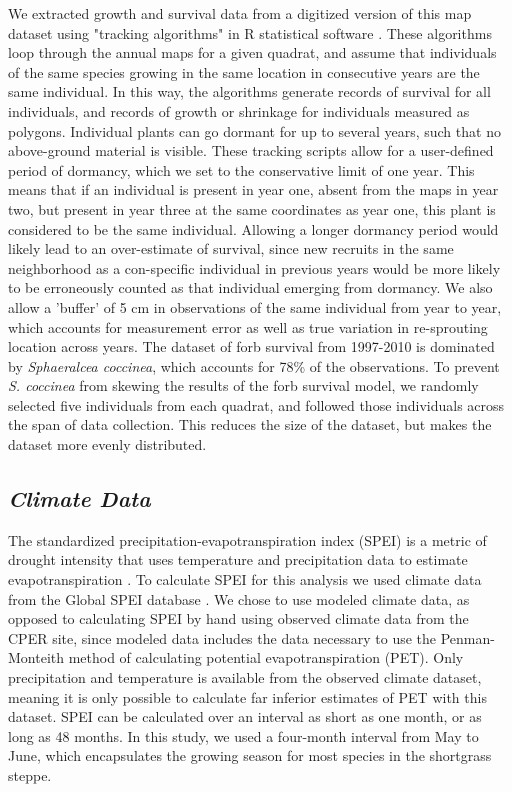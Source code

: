 \documentclass[12pt, letterpaper]{article}
\begin{document}
We extracted growth and survival data from a digitized version of this map dataset using "tracking algorithms" in R statistical software \cite{Lauenroth2008, RCoreTeam2019}. These algorithms loop through the annual maps for a given quadrat, and assume that individuals of the same species growing in the same location in consecutive years are the same individual. In this way, the algorithms generate records of survival for all individuals, and records of growth or shrinkage for individuals measured as polygons. Individual plants can go dormant for up to several years, such that no above-ground material is visible. These tracking scripts allow for a user-defined period of dormancy, which we set to the conservative limit of one year. This means that if an individual is present in year one, absent from the maps in year two, but present in year three at the same coordinates as year one, this plant is considered to be the same individual. Allowing a longer dormancy period would likely lead to an over-estimate of survival, since new recruits in the same neighborhood as a con-specific individual in previous years would be more likely to be erroneously counted as that individual emerging from dormancy. We also allow a 'buffer' of 5 cm in observations of the same individual from year to year, which accounts for measurement error as well as true variation in re-sprouting location across years. The dataset of forb survival from 1997-2010 is dominated by \textit{Sphaeralcea coccinea}, which accounts for 78\% of the observations. To prevent \textit{S. coccinea} from skewing the results of the forb survival model, we randomly selected five individuals from each quadrat, and followed those individuals across the span of data collection. This reduces the size of the dataset, but makes the dataset more evenly distributed.

\subsection{\textit{Climate Data}} The standardized precipitation-evapotranspiration index (SPEI) is a metric of drought intensity that uses temperature and precipitation data to estimate evapotranspiration . To calculate SPEI for this analysis we used climate data from the Global SPEI database \cite{Vicente-Serrano2010}. We chose to use modeled climate data, as opposed to calculating SPEI by hand using observed climate data from the CPER site, since modeled data includes the data necessary to use the Penman-Monteith method of calculating potential evapotranspiration (PET). Only precipitation and temperature is available from the observed climate dataset, meaning it is only possible to calculate far inferior estimates of PET with this dataset. SPEI can be calculated over an interval as short as one month, or as long as 48 months. In this study, we used a four-month interval from May to June, which encapsulates the growing season for most species in the shortgrass steppe. 
\end{document}
